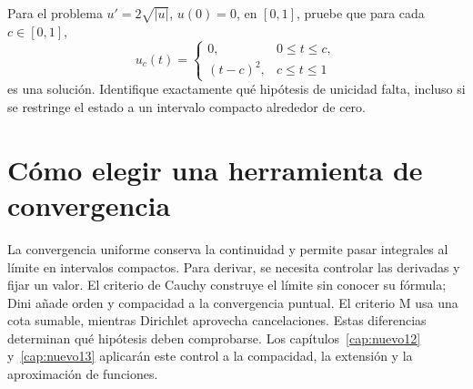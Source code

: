 \begin{ejercicio}\label{ej:ampl-picard-5}
Para el problema $u'=2\sqrt{|u|}$, $u(0)=0$, en $[0,1]$, pruebe que para cada $c\in[0,1]$,
\[
 u_c(t)=\begin{cases}0,&0\le t\le c,\\(t-c)^2,&c\le t\le1\end{cases}
\]
es una solución. Identifique exactamente qué hipótesis de unicidad falta, incluso si se restringe el estado a un intervalo compacto alrededor de cero.
\end{ejercicio}


\section{Cómo elegir una herramienta de convergencia}
La convergencia uniforme conserva la continuidad y permite pasar integrales al límite en intervalos compactos. Para derivar, se necesita controlar las derivadas y fijar un valor. El criterio de Cauchy construye el límite sin conocer su fórmula; Dini añade orden y compacidad a la convergencia puntual. El criterio M usa una cota sumable, mientras Dirichlet aprovecha cancelaciones. Estas diferencias determinan qué hipótesis deben comprobarse. Los capítulos~\ref{cap:nuevo12} y~\ref{cap:nuevo13} aplicarán este control a la compacidad, la extensión y la aproximación de funciones.
